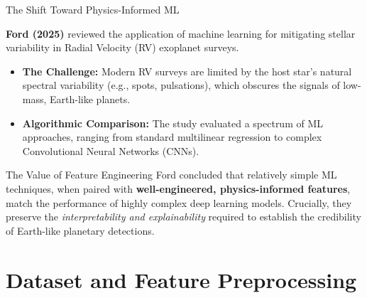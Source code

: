 \documentclass[9pt, aspectratio=169]{beamer}
\begin{document}
\begin{frame}{The Shift Toward Physics-Informed ML}
    
    \textbf{Ford (2025)} reviewed the application of machine learning for mitigating stellar variability in Radial Velocity (RV) exoplanet surveys.

    \vspace{0.2cm}
    \begin{itemize}
        \item \textbf{The Challenge:} Modern RV surveys are limited by the host star's natural spectral variability (e.g., spots, pulsations), which obscures the signals of low-mass, Earth-like planets.
        \item \textbf{Algorithmic Comparison:} The study evaluated a spectrum of ML approaches, ranging from standard multilinear regression to complex Convolutional Neural Networks (CNNs).
    \end{itemize}

    \vspace{0.2cm}
    \begin{block}{The Value of Feature Engineering}
        Ford concluded that relatively simple ML techniques, when paired with \textbf{well-engineered, physics-informed features}, match the performance of highly complex deep learning models. Crucially, they preserve the \textit{interpretability and explainability} required to establish the credibility of Earth-like planetary detections.
    \end{block}
\end{frame}

\section{Dataset and Feature Preprocessing}
\end{document}
